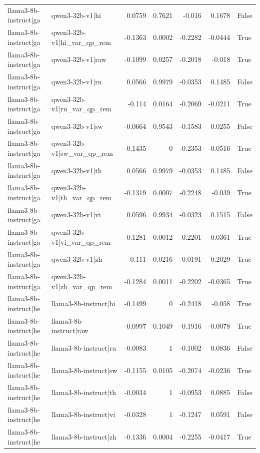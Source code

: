 \begin{table}
\begin{tabular}{l l r r r r l}
llama3-8b-instruct|ga & qwen3-32b-v1|hi & 0.0759 & 0.7621 & -0.016 & 0.1678 & False \\
llama3-8b-instruct|ga & qwen3-32b-v1|hi_var_qp_rem & -0.1363 & 0.0002 & -0.2282 & -0.0444 & True \\
llama3-8b-instruct|ga & qwen3-32b-v1|raw & -0.1099 & 0.0257 & -0.2018 & -0.018 & True \\
llama3-8b-instruct|ga & qwen3-32b-v1|ru & 0.0566 & 0.9979 & -0.0353 & 0.1485 & False \\
llama3-8b-instruct|ga & qwen3-32b-v1|ru_var_qp_rem & -0.114 & 0.0164 & -0.2069 & -0.0211 & True \\
llama3-8b-instruct|ga & qwen3-32b-v1|sw & -0.0664 & 0.9543 & -0.1583 & 0.0255 & False \\
llama3-8b-instruct|ga & qwen3-32b-v1|sw_var_qp_rem & -0.1435 & 0 & -0.2353 & -0.0516 & True \\
llama3-8b-instruct|ga & qwen3-32b-v1|th & 0.0566 & 0.9979 & -0.0353 & 0.1485 & False \\
llama3-8b-instruct|ga & qwen3-32b-v1|th_var_qp_rem & -0.1319 & 0.0007 & -0.2248 & -0.039 & True \\
llama3-8b-instruct|ga & qwen3-32b-v1|vi & 0.0596 & 0.9934 & -0.0323 & 0.1515 & False \\
llama3-8b-instruct|ga & qwen3-32b-v1|vi_var_qp_rem & -0.1281 & 0.0012 & -0.2201 & -0.0361 & True \\
llama3-8b-instruct|ga & qwen3-32b-v1|zh & 0.111 & 0.0216 & 0.0191 & 0.2029 & True \\
llama3-8b-instruct|ga & qwen3-32b-v1|zh_var_qp_rem & -0.1284 & 0.0011 & -0.2202 & -0.0365 & True \\
llama3-8b-instruct|he & llama3-8b-instruct|hi & -0.1499 & 0 & -0.2418 & -0.058 & True \\
llama3-8b-instruct|he & llama3-8b-instruct|raw & -0.0997 & 0.1049 & -0.1916 & -0.0078 & True \\
llama3-8b-instruct|he & llama3-8b-instruct|ru & -0.0083 & 1 & -0.1002 & 0.0836 & False \\
llama3-8b-instruct|he & llama3-8b-instruct|sw & -0.1155 & 0.0105 & -0.2074 & -0.0236 & True \\
llama3-8b-instruct|he & llama3-8b-instruct|th & -0.0034 & 1 & -0.0953 & 0.0885 & False \\
llama3-8b-instruct|he & llama3-8b-instruct|vi & -0.0328 & 1 & -0.1247 & 0.0591 & False \\
llama3-8b-instruct|he & llama3-8b-instruct|zh & -0.1336 & 0.0004 & -0.2255 & -0.0417 & True \\

\end{tabular}
\end{table}
